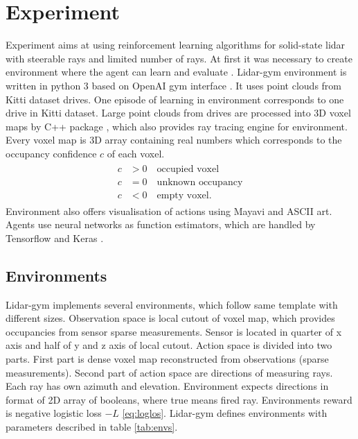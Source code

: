 \section{Experiment}
Experiment aims at using reinforcement learning algorithms for solid-state lidar with steerable rays and limited number of rays. At first it was necessary to create environment where the agent can learn and evaluate \cite{rozsypalek2018}. Lidar-gym environment is written in python 3 based on OpenAI gym interface \cite{openai2016}. It uses point clouds from Kitti dataset drives\cite{geiger2013}. One episode of learning in environment corresponds to one drive in Kitti dataset. Large point clouds from drives are processed into 3D voxel maps by C++ package \cite{petricek2017}, which also provides ray tracing engine for environment. Every voxel map is 3D array containing real numbers which corresponds to the occupancy confidence $c$ of each voxel.
\begin{align}
\begin{split}
c &> 0 \quad \text{occupied voxel} \\
c &= 0 \quad \text{unknown occupancy} \\
c &< 0 \quad \text{empty voxel.}
\end{split}
\end{align}
Environment also offers visualisation of actions using Mayavi \cite{mayavi2011} and ASCII art. Agents use neural networks as function estimators, which are handled by Tensorflow \cite{tensorflow2015} and Keras \cite{keras2015}.

\subsection{Environments}
Lidar-gym implements several environments, which follow same template with different sizes. Observation space is local cutout of voxel map, which provides occupancies from sensor sparse measurements. Sensor is located in quarter of x axis and half of y and z axis of local cutout. Action space is divided into two parts. First part is dense voxel map reconstructed from observations (sparse measurements). Second part of action space are directions of measuring rays. Each ray has own azimuth and elevation. Environment expects directions in format of 2D array of booleans, where true means fired ray. Environments reward is negative logistic loss $-L$ \eqref{eq:loglos}. Lidar-gym defines environments with parameters described in table \ref{tab:envs}.

\renewcommand{\thefootnote}{\fnsymbol{footnote}}

